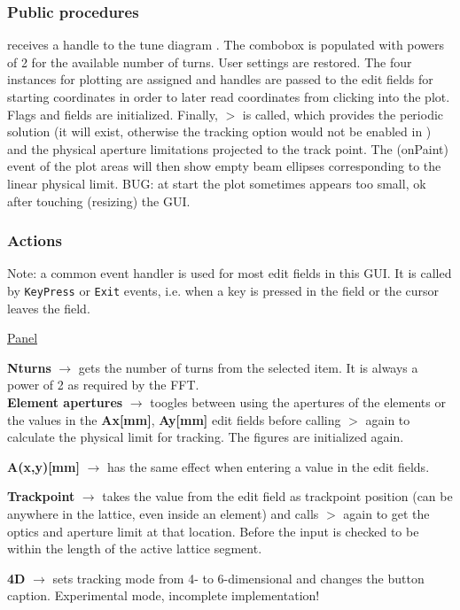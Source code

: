 \documentclass[12pt]{article}
\newcommand\code[1]{{\tt #1}}
\newcommand{\ofld}[1]{\colorbox{black!15}{{{\color{black}\bf #1}}}}
\newcommand{\ofldx}[1]{\colorbox{black!15}{{\color{black}(#1)}}}
\newcommand\guico[1]{{\color{blue}\code{#1}}}
\newcommand{\unico}[1]{{\color{burntorange}\code{#1}}}
\newcommand{\evcod}[2]{\ofld{#1} $\rightarrow$ \guico{#2}}
\newcommand{\prcod}[2]{\opauni{#1}$>$\unico{#2}}
\newcommand{\opagui}[1]{\colorbox{blue!20}{{\color{black}\code{#1}}}}
\newcommand{\ogui}[1]{\hyperref[#1]{\opagui{#1}}}
\newcommand{\opaguif}[1]{\colorbox{violet!30}{{\color{black}\code{#1}}}}
\newcommand{\oguif}[1]{\hyperref[#1]{\opaguif{#1}}}
\newcommand{\opauni}[1]{\colorbox{orange!30}{{\color{black}\code{#1}}}}
\newcommand{\act}[1]{\subsubsection*{Actions} #1}
\newcommand{\ppro}[1]{\subsubsection*{Public procedures} #1}
\newcommand{\todo}[1]{{\color{red} #1}}
\begin{document}
\ppro{
\guico{Start} receives a handle to the tune diagram \ogui{opatunediag}. The combobox \guico{comTurns} is populated with powers of 2 for the available number of turns. User settings are restored. The four \oguif{../com/asfigure} instances for plotting are assigned and handles are passed to the edit fields for starting coordinates in order to later read coordinates from clicking into the plot. Flags and fields are initialized. Finally, \prcod{tracklib}{Initdpp} is called, which provides the periodic solution (it will exist, otherwise the tracking option would not be enabled in \ogui{opamenu}) and the physical aperture limitations projected to the track point. The \ofldx{onPaint} event of the plot areas will then show empty beam ellipses corresponding to the linear physical limit. \todo{BUG: at start the plot sometimes appears too small, ok after touching (resizing) the GUI.}
}

\act{}

Note: a common event handler \guico{ediAction} is used for most edit fields in this GUI. It is called by \code{KeyPress} or \code{Exit} events, i.e. when a key is pressed in the field or the cursor leaves the field.


\underline{Panel \guico{PanParam}}

\evcod{Nturns}{comTurnsChange} gets the number of turns from the selected item. It is always a power of 2 as required by the FFT.\\[1ex]

\evcod{Element apertures}{cbxElAperClick} toogles between using the apertures of the elements or the values in the \ofld{Ax[mm]}, \ofld{Ay[mm]} edit fields before calling \prcod{tracklib}{Initdpp} again to calculate the physical limit for tracking. The \guico{psx,psy} figures are initialized again.

\evcod{A(x,y)[mm]}{ediAction[edi(x,y)aper]} has the same effect when entering a value in the edit fields. 

\evcod{Trackpoint}{ediAction[edistartpos]} takes the value from the edit field as trackpoint position (can be anywhere in the lattice, even inside an element) and calls \prcod{tracklib}{Initdpp} again to get the optics and aperture limit at that location. Before the input is checked to be within the length of the active lattice segment.

\evcod{4D}{butT6Click} sets tracking mode from 4- to 6-dimensional and changes the button caption. \todo{Experimental mode, incomplete implementation!}\\[1ex]
\end{document}
